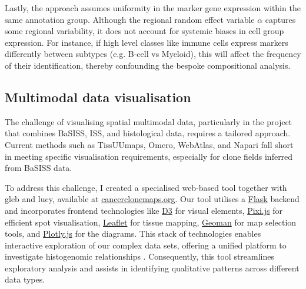Lastly, the approach assumes uniformity in the marker gene expression within the same annotation group. Although the regional random effect variable $\alpha$ captures some regional variability, it does not account for systemic biases in cell group expression. For instance, if high level classes like immune cells express markers differently between subtypes (e.g. B-cell vs Myeloid), this will affect the frequency of their identification, thereby confounding the bespoke compositional analysis.


\subsection{Multimodal data visualisation}
\label{sec:modalities-cancerclonemaps}

The challenge of visualising spatial multimodal data, particularly in the project that combines \ac{BaSISS}, \ac{ISS}, and histological data, requires a tailored approach. Current methods such as \ac{TissUUmaps}, \ac{Omero}, \ac{WebAtlas}, and \ac{Napari} fall short in meeting specific visualisation requirements, especially for clone fields inferred from \ac{BaSISS} data.

To address this challenge, I created a specialised web-based tool together with \acl{gleb} and \acl{lucy}, available at \href{https://www.cancerclonemaps.org/}{cancerclonemaps.org}. Our tool utilises a \href{https://github.com/pallets/flask}{Flask} backend and incorporates frontend technologies like \href{https://github.com/d3/d3}{D3} for visual elements, \href{https://github.com/pixijs/pixijs}{Pixi.js} for efficient spot visualisation, \href{https://github.com/Leaflet/Leaflet}{Leaflet} for tissue mapping, \href{https://github.com/geoman-io/leaflet-geoman}{Geoman} for map selection tools, and \href{https://github.com/plotly/plotly.js}{Plotly.js} for the diagrams. This stack of technologies enables interactive exploration of our complex data sets, offering a unified platform to investigate histogenomic relationships . Consequently, this tool streamlines exploratory analysis and assists in identifying qualitative patterns across different data types.

